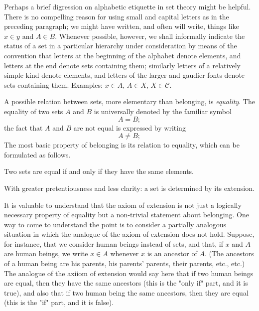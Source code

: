 Perhaps a brief digression on alphabetic etiquette in set theory might be helpful. There is no compelling reason for using small and capital letters as in the preceding paragraph; we might have written, and often will write, things like $x \in y$ and $A \in B$. Whenever possible, however, we shall informally indicate the status of a set in a particular hierarchy under consideration by means of the convention that letters at the beginning of the alphabet denote elements, and letters at the end denote sets containing them; similarly letters of a relatively simple kind denote elements, and letters of the larger and gaudier fonts denote sets containing them. Examples: $x \in A$, $A \in X$, $X \in \mathcal{C}$.


A possible relation between sets, more elementary than belonging, is \textit{equality}. The equality of two sets $A$ and $B$ is universally denoted by the familiar symbol 
\begin{equation*}
A = B;
\end{equation*}
the fact that $A$ and $B$ are not equal is expressed by writing 
\begin{equation*}
A \neq B;
\end{equation*}
The most basic property of belonging is its relation to equality, which can be formulated as follows. 

\begin{named} Two sets are equal if and only if they have the same elements.
\end{named}

\noindent With greater pretentiousness and less clarity: a set is determined by its extension. 

It is valuable to understand that the axiom of extension is not just a logically necessary property of equality but a non-trivial statement about belonging. One way to come to understand the point is to consider a partially analogous situation in which the analogue of the axiom of extension does not hold. Suppose, for instance, that we consider human beings instead of sets, and that, if $x$ and $A$ are human beings, we write $x \in A$ whenever $x$ is an ancestor of $A$. (The ancestors of a human being are his parents, his parents' parents, their parents, etc., etc.) The analogue of the axiiom of extension would say here that if two human beings are equal, then they have the same ancestors (this is the "only if" part, and it is true), and also that if two human being the same ancestors, then they are equal (this is the "if" part, and it is false). 

